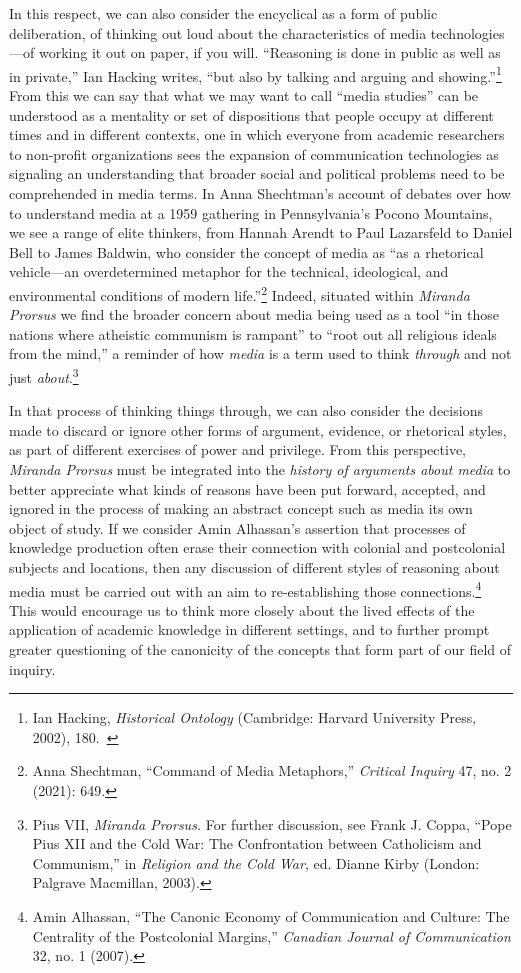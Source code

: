 \documentclass{tufte-handout}
\begin{document}
In this respect, we can also consider the encyclical as a form of public
deliberation, of thinking out loud about the characteristics of media
technologies---of working it out on paper, if you will. ``Reasoning is
done in public as well as in private,'' Ian Hacking writes, ``but also
by talking and arguing and showing.''\footnote{Ian Hacking,
  \emph{Historical Ontology} (Cambridge: Harvard University Press,
  2002), 180.~} From this we can say that what we may want to call
``media studies'' can be understood as a mentality or set of
dispositions that people occupy at different times and in different
contexts, one in which everyone from academic researchers to non-profit
organizations sees the expansion of communication technologies as
signaling an understanding that broader social and political problems
need to be comprehended in media terms. In Anna Shechtman's account of
debates over how to understand media at a 1959 gathering in
Pennsylvania's Pocono Mountains, we see a range of elite thinkers, from
Hannah Arendt to Paul Lazarsfeld to Daniel Bell to James Baldwin, who
consider the concept of media as ``as a rhetorical vehicle---an
overdetermined metaphor for the technical, ideological, and
environmental conditions of modern life.''\footnote{Anna Shechtman,
  ``Command of Media Metaphors,'' \emph{Critical Inquiry} 47, no. 2
  (2021): 649.} Indeed, situated within \emph{Miranda Prorsus} we find
the broader concern about media being used as a tool ``in those nations
where atheistic communism is rampant'' to ``root out all religious
ideals from the mind,'' a reminder of how \emph{media} is a term used to
think \emph{through} and not just \emph{about}.\footnote{Pius VII,
  \emph{Miranda Prorsus.} For further discussion, see Frank J. Coppa,
  ``Pope Pius XII and the Cold War: The Confrontation between
  Catholicism and Communism,'' in \emph{Religion and the Cold War}, ed.
  Dianne Kirby (London: Palgrave Macmillan, 2003).}

In that process of thinking things through, we can also consider the
decisions made to discard or ignore other forms of argument, evidence,
or rhetorical styles, as part of different exercises of power and
privilege. From this perspective, \emph{Miranda Prorsus} must be
integrated into the \emph{history of arguments about media} to better
appreciate what kinds of reasons have been put forward, accepted, and
ignored in the process of making an abstract concept such as media its
own object of study. If we consider Amin Alhassan's assertion that
processes of knowledge production often erase their connection with
colonial and postcolonial subjects and locations, then any discussion of
different styles of reasoning about media must be carried out with an
aim to re-establishing those connections.\footnote{Amin Alhassan, ``The
  Canonic Economy of Communication and Culture: The Centrality of the
  Postcolonial Margins,'' \emph{Canadian Journal of Communication} 32,
  no. 1 (2007).} This would encourage us to think more closely about the
lived effects of the application of academic knowledge in different
settings, and to further prompt greater questioning of the canonicity of
the concepts that form part of our field of inquiry.
\end{document}
